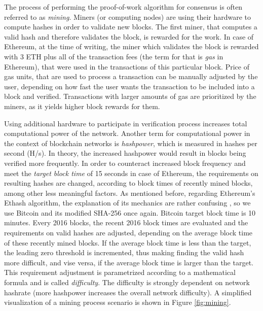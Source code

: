 The process of performing the proof-of-work algorithm for consensus is often referred to as \emph{\gls{mining}}. Miners (or computing nodes) are using their hardware to compute hashes in order to validate new blocks. The first miner, that computes a valid hash and therefore validates the block, is rewarded for the work. In case of Ethereum, at the time of writing, the miner which validates the block is rewarded with 3 ETH plus all of the transaction fees (the term for that is \emph{\gls{gas}} in Ethereum), that were used in the transactions of this particular block. Price of gas units, that are used to process a transaction can be manually adjusted by the user, depending on how fast the user wants the transaction to be included into a block and verified. Transactions with larger amounts of gas are prioritized by the miners, as it yields higher block rewards for them.

Using additional hardware to participate in verification process increases total computational power of the network. Another term for computational power in the context of blockchain networks is \emph{\gls{hashpower}}, which is measured in hashes per second (H/s). In theory, the increased hashpower would result in blocks being verified more frequently. In order to counteract increased block frequency and meet the \emph{\gls{target block time}} of 15 seconds in case of Ethereum, the requirements on resulting hashes are changed, according to block times of recently mined blocks, among other less meaningful factors. As mentioned before, regarding Ethereum's Ethash algorithm, the explanation of its mechanics are rather confusing \citep{ethdiffadj}, so we use Bitcoin and its modified SHA-256 once again. Bitcoin target block time is 10 minutes. Every 2016 blocks, the recent 2016 block times are evaluated and the requirements on valid hashes are adjusted, depending on the average block time of these recently mined blocks. If the average block time is less than the target, the leading zero threshold is incremented, thus making finding the valid hash more difficult, and vise versa, if the average block time is larger than the target. This requirement adjustment is parametrized according to a mathematical formula and is called \emph{\gls{difficulty}}. The difficulty is strongly dependent on network hashrate (more hashpower increases the overall network difficulty). A simplified visualization of a mining process scenario is shown in Figure \ref{fig:mining}. 

